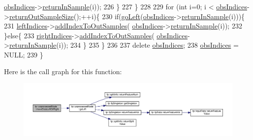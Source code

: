 \begin{DoxyCode}
      \hyperlink{classfp_1_1unprocessedNode_aba9f03124658f62906fa8ded53cef535}{obsIndices}->\hyperlink{classfp_1_1stratifiedInNodeClassIndices_a2d7e802fb97db0367bb8e8f31d393afd}{returnInSample}(i)); 
226                         \}
227                     \}
228 
229                     \textcolor{keywordflow}{for} (\textcolor{keywordtype}{int} i=0; i < \hyperlink{classfp_1_1unprocessedNode_aba9f03124658f62906fa8ded53cef535}{obsIndices}->\hyperlink{classfp_1_1stratifiedInNodeClassIndices_a6630b77af340d2023d88bafa87b94cae}{returnOutSampleSize}();++i)\{
230                         \textcolor{keywordflow}{if}(\hyperlink{classfp_1_1unprocessedNode_ad4ffdb4f4b91d6d21f8954f3c80a3617}{goLeft}(\hyperlink{classfp_1_1unprocessedNode_aba9f03124658f62906fa8ded53cef535}{obsIndices}->\hyperlink{classfp_1_1stratifiedInNodeClassIndices_a2d7e802fb97db0367bb8e8f31d393afd}{returnInSample}(i)))\{
231                             \hyperlink{classfp_1_1unprocessedNode_a8e39fa0144bbb78fd02d1973bd05b5f6}{leftIndices}->\hyperlink{classfp_1_1stratifiedInNodeClassIndices_adc99a046031545bc59c2b43abcf75ed9}{addIndexToOutSamples}(
      \hyperlink{classfp_1_1unprocessedNode_aba9f03124658f62906fa8ded53cef535}{obsIndices}->\hyperlink{classfp_1_1stratifiedInNodeClassIndices_a2d7e802fb97db0367bb8e8f31d393afd}{returnInSample}(i)); 
232                         \}\textcolor{keywordflow}{else}\{
233                             \hyperlink{classfp_1_1unprocessedNode_ac6886f626536370b1276374d4939291e}{rightIndices}->\hyperlink{classfp_1_1stratifiedInNodeClassIndices_adc99a046031545bc59c2b43abcf75ed9}{addIndexToOutSamples}(
      \hyperlink{classfp_1_1unprocessedNode_aba9f03124658f62906fa8ded53cef535}{obsIndices}->\hyperlink{classfp_1_1stratifiedInNodeClassIndices_a2d7e802fb97db0367bb8e8f31d393afd}{returnInSample}(i)); 
234                         \}
235                     \}
236 
237                     \textcolor{keyword}{delete} \hyperlink{classfp_1_1unprocessedNode_aba9f03124658f62906fa8ded53cef535}{obsIndices};
238                     \hyperlink{classfp_1_1unprocessedNode_aba9f03124658f62906fa8ded53cef535}{obsIndices} = NULL;
239                 \}
\end{DoxyCode}
Here is the call graph for this function\+:
\nopagebreak
\begin{figure}[H]
\begin{center}
\leavevmode
\includegraphics[width=350pt]{classfp_1_1unprocessedNode_a0236d2722cb4c32b8ff7e66fc118bed2_cgraph}
\end{center}
\end{figure}
\mbox{\label{classfp_1_1unprocessedNode_a5302bdd3ad2b0de3e2fcd8ed1bf58f61}} 
